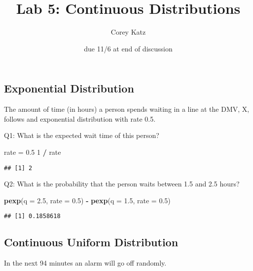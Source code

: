 \documentclass[]{article}
\title{Lab 5: Continuous Distributions}
\author{Corey Katz}
\date{due 11/6 at end of discussion}
\newenvironment{Shaded}{\begin{snugshade}}{\end{snugshade}}
\newcommand{\DataTypeTok}[1]{\textcolor[rgb]{0.13,0.29,0.53}{#1}}
\newcommand{\DecValTok}[1]{\textcolor[rgb]{0.00,0.00,0.81}{#1}}
\newcommand{\FloatTok}[1]{\textcolor[rgb]{0.00,0.00,0.81}{#1}}
\newcommand{\KeywordTok}[1]{\textcolor[rgb]{0.13,0.29,0.53}{\textbf{#1}}}
\newcommand{\NormalTok}[1]{#1}
\newcommand{\OperatorTok}[1]{\textcolor[rgb]{0.81,0.36,0.00}{\textbf{#1}}}
\newcommand{\StringTok}[1]{\textcolor[rgb]{0.31,0.60,0.02}{#1}}
\begin{document}
\maketitle

\hypertarget{exponential-distribution}{%
\subsection{Exponential Distribution}\label{exponential-distribution}}

The amount of time (in hours) a person spends waiting in a line at the
DMV, X, follows and exponential distribution with rate 0.5.

Q1: What is the expected wait time of this person?

\begin{Shaded}
\begin{Highlighting}[]
\NormalTok{rate =}\StringTok{ }\FloatTok{0.5}
\DecValTok{1} \OperatorTok{/}\StringTok{ }\NormalTok{rate}
\end{Highlighting}
\end{Shaded}

\begin{verbatim}
## [1] 2
\end{verbatim}

Q2: What is the probability that the person waits between 1.5 and 2.5
hours?

\begin{Shaded}
\begin{Highlighting}[]
\KeywordTok{pexp}\NormalTok{(}\DataTypeTok{q =} \FloatTok{2.5}\NormalTok{, }\DataTypeTok{rate =} \FloatTok{0.5}\NormalTok{) }\OperatorTok{-}\StringTok{ }\KeywordTok{pexp}\NormalTok{(}\DataTypeTok{q =} \FloatTok{1.5}\NormalTok{, }\DataTypeTok{rate =} \FloatTok{0.5}\NormalTok{)}
\end{Highlighting}
\end{Shaded}

\begin{verbatim}
## [1] 0.1858618
\end{verbatim}

\newpage

\hypertarget{continuous-uniform-distribution}{%
\subsection{Continuous Uniform
Distribution}\label{continuous-uniform-distribution}}

In the next 94 minutes an alarm will go off randomly.
\end{document}
